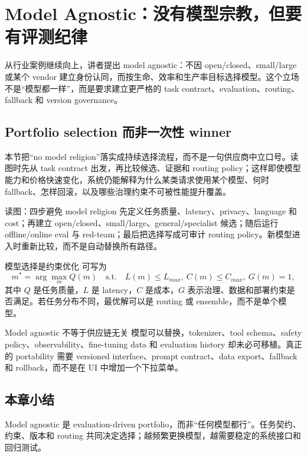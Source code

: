 \section{Model Agnostic：没有模型宗教，但要有评测纪律}

从行业案例继续向上，讲者提出 model agnostic：不因 open/closed、small/large 或某个 vendor 建立身份认同，而按生命、效率和生产率目标选择模型。这个立场不是“模型都一样”，而是要求建立更严格的 task contract、evaluation、routing、fallback 和 version governance。

\subsection{Portfolio selection 而非一次性 winner}

本节把“no model religion”落实成持续选择流程，而不是一句供应商中立口号。读图时先从 task contract 出发，再比较候选、证据和 routing policy；这样即使模型能力和价格快速变化，系统仍能解释为什么某类请求使用某个模型、何时 fallback、怎样回滚，以及哪些治理约束不可被性能提升覆盖。


\begin{knowledgebox}{读图：四步避免 model religion}
先定义任务质量、latency、privacy、language 和 cost；再建立 open/closed、small/large、general/specialist 候选；随后运行 offline/online eval 与 red-team；最后把选择写成可审计 routing policy。新模型进入时重新比较，而不是自动替换所有路径。
\end{knowledgebox}

\begin{importantbox}{模型选择是约束优化}
可写为
\[
m^*=\arg\max_m Q(m)\quad
\text{s.t.}\quad L(m)\leq L_{max},\ C(m)\leq C_{max},\ G(m)=1,
\]
其中 $Q$ 是任务质量，$L$ 是 latency，$C$ 是成本，$G$ 表示治理、数据和部署约束是否满足。若任务分布不同，最优解可以是 routing 或 ensemble，而不是单个模型。
\end{importantbox}

\begin{warningbox}{Model agnostic 不等于供应链无关}
模型可以替换，tokenizer、tool schema、safety policy、observability、fine-tuning data 和 evaluation history 却未必可移植。真正的 portability 需要 versioned interface、prompt contract、data export、fallback 和 rollback，而不是在 UI 中增加一个下拉菜单。
\end{warningbox}


\subsection{本章小结}

Model agnostic 是 evaluation-driven portfolio，而非“任何模型都行”。任务契约、约束、版本和 routing 共同决定选择；越频繁更换模型，越需要稳定的系统接口和回归测试。

